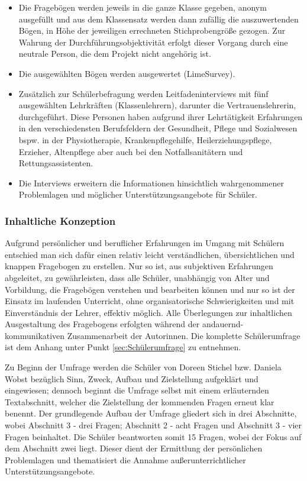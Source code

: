 \begin{itemize}
	\item Die Fragebögen werden jeweils in die ganze Klasse gegeben, anonym ausgefüllt und aus dem Klassensatz werden dann zufällig die auszuwertenden Bögen, in Höhe der jeweiligen errechneten Stichprobengröße gezogen. Zur Wahrung der Durchführungsobjektivität erfolgt dieser Vorgang durch eine neutrale Person, die dem Projekt nicht angehörig ist. 
	\item Die ausgewählten Bögen werden ausgewertet (LimeSurvey).
	\item Zusätzlich zur Schülerbefragung werden Leitfadeninterviews mit fünf ausgewählten Lehrkräften (Klassenlehrern), darunter die Vertrauenslehrerin, durchgeführt. Diese Personen haben aufgrund ihrer Lehrtätigkeit Erfahrungen in den verschiedensten Berufsfeldern der Gesundheit, Pflege und Sozialwesen bspw. in der Physiotherapie, Krankenpflegehilfe, Heilerziehungspflege, Erzieher, Altenpflege aber auch bei den Notfallsanitätern und Rettungsassistenten.
	\item Die Interviews erweitern die Informationen hinsichtlich wahrgenommener Problemlagen und möglicher Unterstützungsangebote für Schüler.
\end{itemize}

\subsubsection{Inhaltliche Konzeption}
\label{sec:InhaltlicheKonzeption}

Aufgrund persönlicher und beruflicher Erfahrungen im Umgang mit Schülern entschied man sich dafür einen relativ leicht verständlichen, übersichtlichen und knappen Fragebogen zu erstellen. Nur so ist, aus subjektiven Erfahrungen abgeleitet, zu gewährleisten, dass alle Schüler, unabhängig von Alter und Vorbildung, die Fragebögen verstehen und bearbeiten können und nur so ist der Einsatz im laufenden Unterricht, ohne organisatorische Schwierigkeiten und mit Einverständnis der Lehrer, effektiv möglich. Alle Überlegungen zur inhaltlichen Ausgestaltung des Fragebogens erfolgten während der andauernd-kommunikativen Zusammenarbeit der Autorinnen. Die komplette Schülerumfrage ist dem Anhang unter Punkt \ref{sec:Schülerumfrage} zu entnehmen.

Zu Beginn der Umfrage werden die Schüler von Doreen Stichel bzw. Daniela Wobst bezüglich Sinn, Zweck, Aufbau und Zielstellung aufgeklärt und eingewiesen; dennoch beginnt die Umfrage selbst mit einem erläuternden Textabschnitt, welcher die Zielstellung der kommenden Fragen erneut klar benennt. Der grundlegende Aufbau der Umfrage gliedert sich in drei Abschnitte, wobei Abschnitt 3 - drei Fragen; Abschnitt 2 - acht Fragen und Abschnitt 3 - vier Fragen beinhaltet. Die Schüler beantworten somit 15 Fragen, wobei der Fokus auf dem Abschnitt zwei liegt. Dieser dient der Ermittlung der persönlichen Problemlagen und thematisiert die Annahme außerunterrichtlicher Unterstützungsangebote. 


